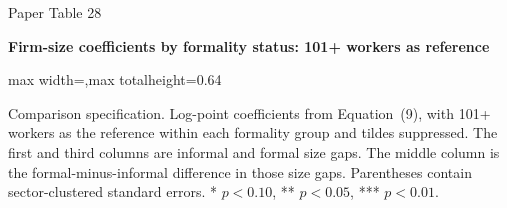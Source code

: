 \begin{frame}{Paper Table 28}
\begin{minipage}{\textwidth}\small\textbf{Firm-size coefficients by formality status: 101+ workers as reference}\end{minipage}\par\vspace{0.15cm}
\centering\begingroup\fontsize{8.5}{10}\selectfont
\setlength{\tabcolsep}{4pt}\renewcommand{\arraystretch}{1.06}
\begin{adjustbox}{max width=\textwidth,max totalheight=0.64\textheight}

\end{adjustbox}\endgroup\par\vspace{0.10cm}
{\fontsize{6.5}{7.5}\selectfont\raggedright Comparison specification. Log-point coefficients from Equation~(9), with 101+ workers as the reference within each formality group and tildes suppressed. The first and third columns are informal and formal size gaps. The middle column is the formal-minus-informal difference in those size gaps. Parentheses contain sector-clustered standard errors. * $p<0.10$, ** $p<0.05$, *** $p<0.01$.\par}
\end{frame}

